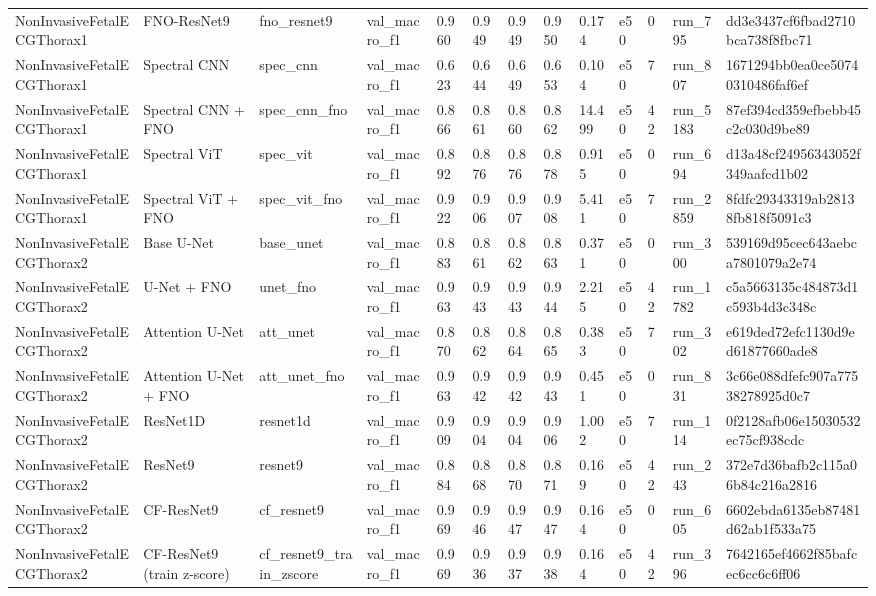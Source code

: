\begin{longtable}{lllllllllllll}
NonInvasiveFetalECGThorax1 & FNO-ResNet9 & fno\_resnet9 & val\_macro\_f1 & 0.960 & 0.949 & 0.949 & 0.950 & 0.174 & e50 & 0 & run\_795 & dd3e3437cf6fbad2710bca738f8fbc71 \\
NonInvasiveFetalECGThorax1 & Spectral CNN & spec\_cnn & val\_macro\_f1 & 0.623 & 0.644 & 0.649 & 0.653 & 0.104 & e50 & 7 & run\_807 & 1671294bb0ea0ce50740310486faf6ef \\
NonInvasiveFetalECGThorax1 & Spectral CNN + FNO & spec\_cnn\_fno & val\_macro\_f1 & 0.866 & 0.861 & 0.860 & 0.862 & 14.499 & e50 & 42 & run\_5183 & 87ef394cd359efbebb45c2c030d9be89 \\
NonInvasiveFetalECGThorax1 & Spectral ViT & spec\_vit & val\_macro\_f1 & 0.892 & 0.876 & 0.876 & 0.878 & 0.915 & e50 & 0 & run\_694 & d13a48cf24956343052f349aafcd1b02 \\
NonInvasiveFetalECGThorax1 & Spectral ViT + FNO & spec\_vit\_fno & val\_macro\_f1 & 0.922 & 0.906 & 0.907 & 0.908 & 5.411 & e50 & 7 & run\_2859 & 8fdfc29343319ab28138fb818f5091c3 \\
NonInvasiveFetalECGThorax2 & Base U-Net & base\_unet & val\_macro\_f1 & 0.883 & 0.861 & 0.862 & 0.863 & 0.371 & e50 & 0 & run\_300 & 539169d95cec643aebca7801079a2e74 \\
NonInvasiveFetalECGThorax2 & U-Net + FNO & unet\_fno & val\_macro\_f1 & 0.963 & 0.943 & 0.943 & 0.944 & 2.215 & e50 & 42 & run\_1782 & c5a5663135c484873d1c593b4d3c348c \\
NonInvasiveFetalECGThorax2 & Attention U-Net & att\_unet & val\_macro\_f1 & 0.870 & 0.862 & 0.864 & 0.865 & 0.383 & e50 & 7 & run\_302 & e619ded72efc1130d9ed61877660ade8 \\
NonInvasiveFetalECGThorax2 & Attention U-Net + FNO & att\_unet\_fno & val\_macro\_f1 & 0.963 & 0.942 & 0.942 & 0.943 & 0.451 & e50 & 0 & run\_831 & 3c66e088dfefc907a77538278925d0c7 \\
NonInvasiveFetalECGThorax2 & ResNet1D & resnet1d & val\_macro\_f1 & 0.909 & 0.904 & 0.904 & 0.906 & 1.002 & e50 & 7 & run\_114 & 0f2128afb06e15030532ec75cf938cdc \\
NonInvasiveFetalECGThorax2 & ResNet9 & resnet9 & val\_macro\_f1 & 0.884 & 0.868 & 0.870 & 0.871 & 0.169 & e50 & 42 & run\_243 & 372e7d36bafb2c115a06b84c216a2816 \\
NonInvasiveFetalECGThorax2 & CF-ResNet9 & cf\_resnet9 & val\_macro\_f1 & 0.969 & 0.946 & 0.947 & 0.947 & 0.164 & e50 & 0 & run\_605 & 6602ebda6135eb87481d62ab1f533a75 \\
NonInvasiveFetalECGThorax2 & CF-ResNet9 (train z-score) & cf\_resnet9\_train\_zscore & val\_macro\_f1 & 0.969 & 0.936 & 0.937 & 0.938 & 0.164 & e50 & 42 & run\_396 & 7642165ef4662f85bafcec6cc6c6ff06 \\

\end{longtable}
